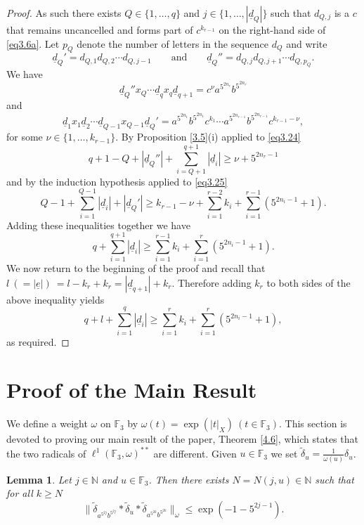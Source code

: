\documentclass[twoside,11pt]{amsart}
\numberwithin{equation}{section}
\newtheorem{lemma}[theorem]{Lemma}
\theoremstyle{definition}
\newcommand {\N}{\mathbb N}
\newcommand{\1}{\mathbbm{1}}
\newcommand{\F}{\mathbb F}
\newcommand{\pdt}{\underline}
\begin{document}
\begin{proof}
		As such there exists $Q \in \{1, \ldots, q \}$ and $j \in \{ 1, \ldots, |\pdt{d}_Q| \}$ such that $d_{Q,j}$ is a $c$ that remains uncancelled and forms part of $c^{k_{r-1}}$ on the right-hand side of \eqref{eq3.6a}. Let $p_Q$ denote the number of letters in the sequence $d_Q$ and write
		$$\pdt{d}_Q' = d_{Q,1}d_{Q,2} \cdots d_{Q, j-1} \qquad \text{and} \qquad \pdt{d}_Q'' = d_{Q,j}d_{Q,j+1} \cdots d_{Q, p_Q}.$$    
		We have 
		\begin{equation}	\label{eq3.24}
			\pdt{d}_Q'' x_Q  \cdots \pdt{d}_q x_q \pdt{d}_{q+1} = c^\nu a^{5^{2n_r}}b^{5^{2n_r}} 
		\end{equation}
		and
		\begin{equation} 	\label{eq3.25}
		\pdt{d}_1 x_1 \pdt{d}_2 \cdots \pdt{d}_{Q-1} x_{Q-1} \pdt{d}_Q' = a^{5^{2n_1}} b^{5^{2n_1}} c^{k_1} \cdots a^{5^{2n_{r-1}}}b^{5^{2n_{r-1}}} c^{k_{r-1} -\nu},
		\end{equation}
		for some $\nu \in \{ 1, \ldots, k_{r-1} \}$. 
		By Proposition \ref{3.5}(i) applied to \eqref{eq3.24}
		$$q+1-Q + |\pdt{d}_Q''| + \sum_{i=Q+1}^{q+1} |\pdt{d}_i| \geq \nu + 5^{2n_r - 1}$$
		and by the induction hypothesis applied to \eqref{eq3.25}
		$$Q-1 + \sum_{i=1}^{Q-1} |\pdt{d}_i| + |\pdt{d}_Q'| 
		\geq k_{r-1}-\nu + \sum _{i = 1}^{r-2} k_i +  \sum_{i=1}^{r-1} (5^{2n_i-1} +1).$$
		Adding these inequalities together we have
		$$q + \sum_{i=1}^{q+1} |\pdt{d}_i| \geq \sum _{i = 1}^{r-1} k_i + \sum_{i=1}^r (5^{2n_i-1} +1).$$
		We now return to the beginning of the proof 
		and recall that $l \ (=  |\pdt{e}|) \ = l-k_r + k_r = |\pdt{d}_{q+1}| + k_r.$ Therefore adding $k_r$ to both sides of the above inequality yields
		$$q +l + \sum_{i=1}^q |\pdt{d}_i| \geq \sum _{i = 1}^r k_i + \sum_{i=1}^r (5^{2n_i-1} +1),$$
		as required.
	\end{proof}
	
	
	
	
	
	
	
	\section{Proof of the Main Result}
	\noindent
	We define a weight $\omega$ on $\F_3$ by $\omega(t) = \exp(|t|_X) \ (t \in \F_3)$. This section is devoted to proving our main result of the paper, Theorem \ref{4.6}, which states that the two radicals of $\ell^1(\F_3, \omega)^{**}$ are different.	
	Given $u \in \F_3$ we set $\widetilde{\delta}_u = \frac{1}{\omega(u)} \delta_u$.
	
	\begin{lemma}		\label{4.1}
		Let $j \in \N$ and $u \in \F_3$. Then there exists $N = N(j,u) \in \N$ such that for all $k \geq N$
		$$\| \widetilde{\delta}_{a^{5^{2j}} b^{5^{2j}}} * \widetilde{\delta}_u * \widetilde{\delta}_{a^{5^{2k}} b^{5^{2k}}} \|_\omega 
		\leq \exp(-1 - 5^{2j-1}).$$
	\end{lemma}
	
\end{document}
